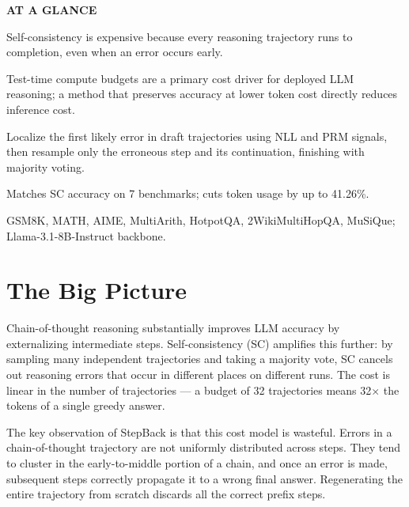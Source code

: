 \documentclass[10pt,twocolumn]{article}
\begin{document}
\begin{mdframed}[backgroundcolor=boxgray,linecolor=rulered,linewidth=1pt,
    innerleftmargin=6pt,innerrightmargin=6pt,
    innertopmargin=6pt,innerbottommargin=6pt]
\textbf{\small AT A GLANCE}\par\vspace{4pt}
\begin{description}[leftmargin=0pt,labelsep=4pt,itemsep=2pt,parsep=0pt,
    font=\small\bfseries]
  \item[Problem:] Self-consistency is expensive because every reasoning
    trajectory runs to completion, even when an error occurs early.
  \item[Why it matters:] Test-time compute budgets are a primary cost
    driver for deployed LLM reasoning; a method that preserves accuracy
    at lower token cost directly reduces inference cost.
  \item[Method:] Localize the first likely error in draft trajectories
    using NLL and PRM signals, then resample only the erroneous step and
    its continuation, finishing with majority voting.
  \item[Result:] Matches SC accuracy on 7 benchmarks; cuts token usage
    by up to 41.26\%.
  \item[Evidence:] GSM8K, MATH, AIME, MultiArith, HotpotQA,
    2WikiMultiHopQA, MuSiQue; Llama-3.1-8B-Instruct backbone.
\end{description}
\end{mdframed}

\section{The Big Picture}

Chain-of-thought reasoning substantially improves LLM accuracy by
externalizing intermediate steps. Self-consistency (SC) amplifies this
further: by sampling many independent trajectories and taking a majority
vote, SC cancels out reasoning errors that occur in different places on
different runs. The cost is linear in the number of trajectories --- a
budget of 32 trajectories means 32$\times$ the tokens of a single
greedy answer.

The key observation of StepBack is that this cost model is wasteful.
Errors in a chain-of-thought trajectory are not uniformly distributed
across steps. They tend to cluster in the early-to-middle portion of a
chain, and once an error is made, subsequent steps correctly propagate
it to a wrong final answer. Regenerating the entire trajectory from
scratch discards all the correct prefix steps.
\end{document}
